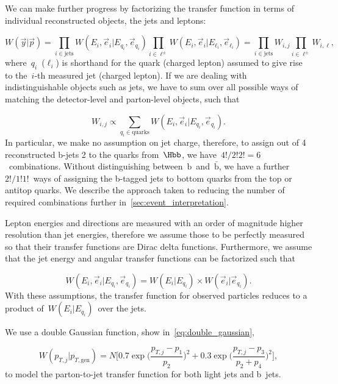 We can make further progress by factorizing the transfer function in terms of individual reconstructed objects, the jets and leptons:

\begin{equation}
W(\vec{y} | \vec{p}) = \prod_{i\in \mathrm{jets}} W(E_i, \vec{e}_i | E_{q_i}, \vec{e}_{q_i})
\prod_{i\in \ell^\pm} W(E_i, \vec{e}_i | E_{\ell_i}, \vec{e}_{\ell_i}) = \prod_{i \in \mathrm{jets}} W_{i,j} \prod_{i \in \ell^\pm} W_{i,\ell},
\end{equation}
where~$q_i$~($\ell_i$) is shorthand for the quark (charged lepton) assumed to give rise to the~$i$-th measured jet (charged lepton). If we are dealing with indistinguishable objects such as jets, we have to sum over all possible ways of matching the detector-level and parton-level objects, such that

\begin{equation}
\label{eq:tf_combination_sum}
W_{i,j} \propto \sum_{q_i \in \mathrm{quarks}} W(E_i, \vec{e}_i | E_{q_i}, \vec{e}_{q_i}).
\end{equation}
In particular, we make no assumption on jet charge, therefore, to assign out of 4 reconstructed b-jets 2 to the quarks from~$\Hbb$, we have~$4!/2!2! = 6$~combinations. Without distinguishing between~$\mathrm{b}$~and~$\bar{\mathrm{b}}$, we have a further~$2!/1!1!$~ways of assigning the b-tagged jets to bottom quarks from the top or antitop quarks. We describe the approach taken to reducing the number of required combinations further in~\cref{sec:event_interpretation}.

Lepton energies and directions are measured with an order of magnitude higher resolution than jet energies, therefore we assume those to be perfectly measured so that their transfer functions are Dirac delta functions.
Furthermore, we assume that the jet energy and angular transfer functions can be factorized such that

\begin{equation}
W(E_i, \vec{e}_i | E_{q_i}, \vec{e}_{q_i}) = W(E_i | E_{q_i}) \times W(\vec{e}_i | \vec{e}_{q_i}).
\end{equation}
With these assumptions, the transfer function for observed particles reduces to a product of~$W(E_i | E_{q_i})$~over the jets.

We use a double Gaussian function, show in~\cref{eq:double_gaussian},

\begin{equation}
\label{eq:double_gaussian}
W(p_{T,j} | p_{T,\mathrm{gen}}) = N \biggl[0.7\exp{\biggl(\frac{p_{T,j} - p_1}{p_2}\biggr)^2} + 0.3\exp{\biggl(\frac{p_{T,j} - p_3}{p_2+p_4}\biggr)^2}\biggr],
\end{equation}
to model the parton-to-jet transfer function for both light jets and b~jets.


